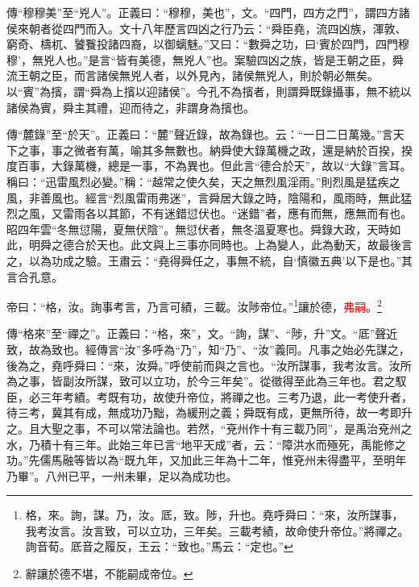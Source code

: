 {\noindent\zhuan{}\fzbyks 傳“穆穆美”至“兇人”。正義曰：“穆穆，美也”，文。“四門，四方之門”，謂四方諸侯來朝者從四門而入。文十八年歷言四凶之行乃云：“舜臣堯，流四凶族，渾敦、窮奇、檮杌、饕餮投諸四裔，以御螭魅。”又曰：“數舜之功，曰‘賓於四門，四門穆穆’，無兇人也。”是言“皆有美德，無兇人”也。案驗四凶之族，皆是王朝之臣，舜流王朝之臣，而言諸侯無兇人者，以外見內，諸侯無兇人，則於朝必無矣。以“賓”為擯，謂“舜為上擯以迎諸侯”。今孔不為擯者，則謂舜既錄攝事，無不統以諸侯為賓，舜主其禮，迎而待之，非謂身為擯也。 \par}

{\noindent\zhuan{}\fzbyks 傳“麓錄”至“於天”。正義曰：“麓”聲近錄，故為錄也。云：“一日二日萬幾。”言天下之事，事之微者有萬，喻其多無數也。納舜使大錄萬機之政，還是納於百揆，揆度百事，大錄萬機，總是一事，不為異也。但此言“德合於天”，故以“大錄”言耳。稱曰：“迅雷風烈必變。”稱：“越常之使久矣，天之無烈風淫雨。”則烈風是猛疾之風，非善風也。經言“烈風雷雨弗迷”，言舜居大錄之時，陰陽和，風雨時，無此猛烈之風，又雷雨各以其節，不有迷錯愆伏也。“迷錯”者，應有而無，應無而有也。昭四年雲“冬無愆陽，夏無伏陰”。無愆伏者，無冬溫夏寒也。舜錄大政，天時如此，明舜之德合於天也。此文與上三事亦同時也。上為變人，此為動天，故最後言之，以為功成之驗。王肅云：“堯得舜任之，事無不統，自‘慎徽五典’以下是也。”其言合孔意。 \par}

帝曰：“格，汝。詢事考言，乃言可績，三載。汝陟帝位。”\footnote{格，來。詢，謀。乃，汝。厎，致。陟，升也。堯呼舜曰：“來，汝所謀事，我考汝言。汝言致，可以立功，三年矣。三載考績，故命使升帝位。”將禪之。詢音荀。厎音之履反，王云：“致也。”馬云：“定也。”}讓於德，\textcolor{red}{弗嗣}。\footnote{辭讓於德不堪，不能嗣成帝位。}

{\noindent\zhuan{}\fzbyks 傳“格來”至“禪之”。正義曰：“格，來”，文。“詢，謀”、“陟，升”文。“厎”聲近致，故為致也。經傳言“汝”多呼為“乃”，知“乃”、“汝”義同。凡事之始必先謀之，後為之，堯呼舜曰：“來，汝舜。”呼使前而與之言也。“汝所謀事，我考汝言。汝所為之事，皆副汝所謀，致可以立功，於今三年矣”。從徵得至此為三年也。君之馭臣，必三年考績。考既有功，故使升帝位，將禪之也。三考乃退，此一考使升者，待三考，冀其有成，無成功乃黜，為緩刑之義；舜既有成，更無所待，故一考即升之。且大聖之事，不可以常法論也。若然，“兗州作十有三載乃同”，是禹治兗州之水，乃積十有三年。此始三年已言“地平天成”者，云：“障洪水而殛死，禹能修之功。”先儒馬融等皆以為“既九年，又加此三年為十二年，惟兗州未得盡平，至明年乃畢”。八州已平，一州未畢，足以為成功也。 \par}

